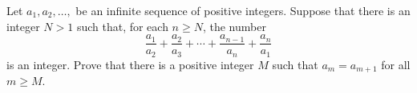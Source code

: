 Let $a_1,a_2,\ldots,$ be an infinite sequence of positive integers. Suppose that there is an integer $N>1$ such that, for each $n\geq N$, the number \[\frac{a_1}{a_2}+\frac{a_2}{a_3}+\cdots+\frac{a_{n-1}}{a_n}+\frac{a_n}{a_1}\] is an integer. Prove that there is a positive integer $M$ such that $a_m=a_{m+1}$ for all $m\geq M$.